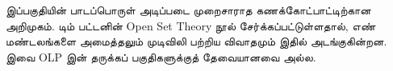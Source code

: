 \documentclass[../../include/open-logic-part]{subfiles}
\begin{document}

\begin{editorial}
இப்பகுதியின் பாடப்பொருள் அடிப்படை முறைசாராத கணக்கோட்பாட்டிற்கான
அறிமுகம். டிம் பட்டனின் Open Set Theory நூல் சேர்க்கப்பட்டுள்ளதால்,
எண் மண்டலங்களை அமைத்தலும் முடிவிலி பற்றிய விவாதமும் இதில்
அடங்குகின்றன. இவை OLP இன் தருக்கப் பகுதிகளுக்குத் தேவையானவை அல்ல.
\end{editorial}







\OLEndPartHook
\end{document}
